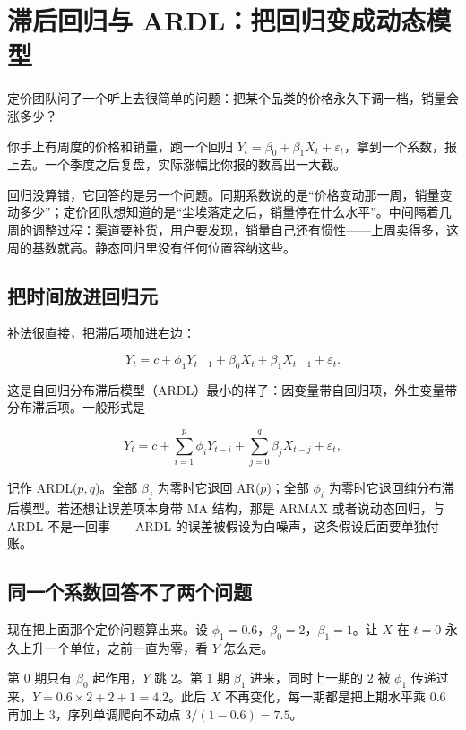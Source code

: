 \section{滞后回归与 ARDL：把回归变成动态模型}
\label{sec:06-Random-Processes/06-ARMA-and-ARIMA/05}

定价团队问了一个听上去很简单的问题：把某个品类的价格永久下调一档，销量会涨多少？

你手上有周度的价格和销量，跑一个回归 \(Y_t=\beta_0+\beta_1X_t+\varepsilon_t\)，拿到一个系数，报上去。一个季度之后复盘，实际涨幅比你报的数高出一大截。

回归没算错，它回答的是另一个问题。同期系数说的是``价格变动那一周，销量变动多少''；定价团队想知道的是``尘埃落定之后，销量停在什么水平''。中间隔着几周的调整过程：渠道要补货，用户要发现，销量自己还有惯性——上周卖得多，这周的基数就高。静态回归里没有任何位置容纳这些。

\subsection{把时间放进回归元}

补法很直接，把滞后项加进右边：

\[
Y_t=c+\phi_1Y_{t-1}+\beta_0X_t+\beta_1X_{t-1}+\varepsilon_t.
\]

这是自回归分布滞后模型（ARDL）最小的样子：因变量带自回归项，外生变量带分布滞后项。一般形式是

\[
Y_t=c+\sum_{i=1}^{p}\phi_iY_{t-i}+\sum_{j=0}^{q}\beta_jX_{t-j}+\varepsilon_t,
\]

记作 ARDL(\(p,q\))。全部 \(\beta_j\) 为零时它退回 AR(\(p\))；全部 \(\phi_i\) 为零时它退回纯分布滞后模型。若还想让误差项本身带 MA 结构，那是 ARMAX 或者说动态回归，与 ARDL 不是一回事——ARDL 的误差被假设为白噪声，这条假设后面要单独付账。

\subsection{同一个系数回答不了两个问题}

现在把上面那个定价问题算出来。设 \(\phi_1=0.6\)，\(\beta_0=2\)，\(\beta_1=1\)。让 \(X\) 在 \(t=0\) 永久上升一个单位，之前一直为零，看 \(Y\) 怎么走。

第 \(0\) 期只有 \(\beta_0\) 起作用，\(Y\) 跳 \(2\)。第 \(1\) 期 \(\beta_1\) 进来，同时上一期的 \(2\) 被 \(\phi_1\) 传递过来，\(Y=0.6\times2+2+1=4.2\)。此后 \(X\) 不再变化，每一期都是把上期水平乘 \(0.6\) 再加上 \(3\)，序列单调爬向不动点 \(3/(1-0.6)=7.5\)。

